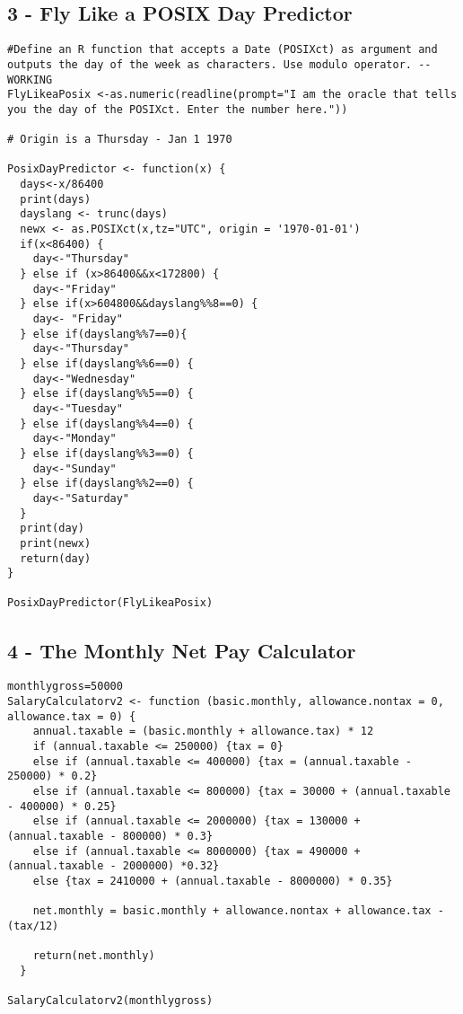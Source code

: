 \documentclass[]{article}
\begin{document}
\subsection{3 - Fly Like a POSIX Day
Predictor}\label{fly-like-a-posix-day-predictor}

\begin{verbatim}
#Define an R function that accepts a Date (POSIXct) as argument and outputs the day of the week as characters. Use modulo operator. -- WORKING
FlyLikeaPosix <-as.numeric(readline(prompt="I am the oracle that tells you the day of the POSIXct. Enter the number here."))

# Origin is a Thursday - Jan 1 1970

PosixDayPredictor <- function(x) {
  days<-x/86400
  print(days)
  dayslang <- trunc(days)
  newx <- as.POSIXct(x,tz="UTC", origin = '1970-01-01')
  if(x<86400) {
    day<-"Thursday"
  } else if (x>86400&&x<172800) {
    day<-"Friday"
  } else if(x>604800&&dayslang%%8==0) {
    day<- "Friday"
  } else if(dayslang%%7==0){
    day<-"Thursday"
  } else if(dayslang%%6==0) {
    day<-"Wednesday"
  } else if(dayslang%%5==0) {
    day<-"Tuesday"
  } else if(dayslang%%4==0) {
    day<-"Monday"
  } else if(dayslang%%3==0) {
    day<-"Sunday"
  } else if(dayslang%%2==0) {
    day<-"Saturday"
  }
  print(day)
  print(newx)
  return(day)
}

PosixDayPredictor(FlyLikeaPosix)
\end{verbatim}

\subsection{4 - The Monthly Net Pay
Calculator}\label{the-monthly-net-pay-calculator}

\begin{verbatim}
monthlygross=50000
SalaryCalculatorv2 <- function (basic.monthly, allowance.nontax = 0, allowance.tax = 0) {
    annual.taxable = (basic.monthly + allowance.tax) * 12
    if (annual.taxable <= 250000) {tax = 0}
    else if (annual.taxable <= 400000) {tax = (annual.taxable - 250000) * 0.2} 
    else if (annual.taxable <= 800000) {tax = 30000 + (annual.taxable - 400000) * 0.25}
    else if (annual.taxable <= 2000000) {tax = 130000 + (annual.taxable - 800000) * 0.3}
    else if (annual.taxable <= 8000000) {tax = 490000 + (annual.taxable - 2000000) *0.32}
    else {tax = 2410000 + (annual.taxable - 8000000) * 0.35}
    
    net.monthly = basic.monthly + allowance.nontax + allowance.tax - (tax/12)
    
    return(net.monthly)
  }

SalaryCalculatorv2(monthlygross)
\end{verbatim}
\end{document}

